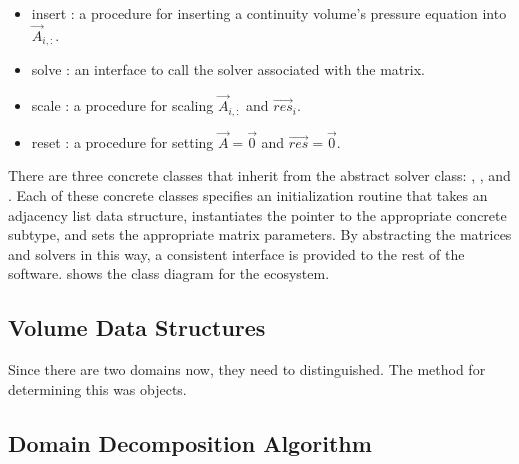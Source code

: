 \begin{itemize}
\item{ insert : a procedure for inserting a continuity volume's pressure equation into $\vec{A}_{i, :}$.}
\item{ solve : an interface to call the solver associated with the matrix.}
\item{ scale : a procedure for scaling $\vec{A}_{i, :}$ and $\vec{res}_{i}$.}
\item{ reset : a procedure for setting $\vec{A} = \vec{0}$ and $\vec{res} = \vec{0}$.}
\end{itemize}

There are three concrete classes that inherit from the abstract solver class: , , and .
Each of these concrete classes specifies an initialization routine that takes an adjacency list data structure, instantiates the  pointer to the appropriate concrete subtype, and sets the appropriate matrix parameters.
By abstracting the matrices and solvers in this way, a consistent interface is provided to the rest of the software.
 shows the class diagram for the  ecosystem.

\subsection{Volume Data Structures}
\label{subsect:domDecompVolumeStructs}

Since there are two domains now, they need to distinguished.
The method for determining this was objects.



\subsection{Domain Decomposition Algorithm}
\label{subsect:domDecompAlgorithm}

